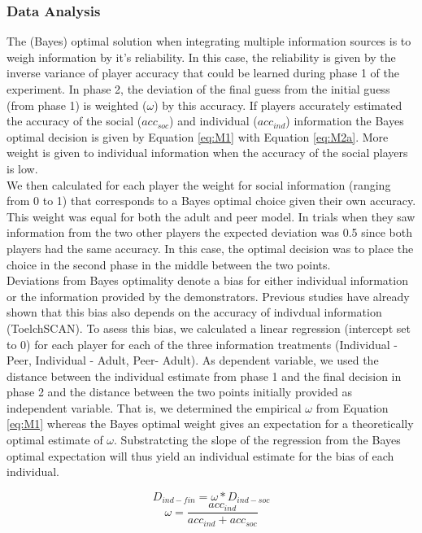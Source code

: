 \documentclass[man]{apa}
\begin{document}
\subsubsection{Data Analysis}
The (Bayes) optimal solution when integrating multiple information sources is to weigh information by it's reliability. In this case, the reliability is given by the inverse variance of player accuracy that could be learned during phase 1 of the experiment. In phase 2, the deviation of the final guess from the initial guess (from phase 1) is weighted ($\omega$) by this accuracy. If players accurately estimated the accuracy of the social ($acc_{soc}$) and individual ($acc_{ind}$) information the Bayes optimal decision is given by Equation \ref{eq:M1} with Equation \ref{eq:M2a}. More weight is given to individual information when the accuracy of the social players is low. \\
We then calculated for each player the weight for social information (ranging from 0 to 1) that corresponds to a Bayes optimal choice given their own accuracy. This weight was equal for both the adult and peer model. In trials when they saw information from the two other players the expected deviation was 0.5 since both players had the same accuracy. In this case, the optimal decision was to place the choice in the second phase in the middle between the two points. \\
Deviations from Bayes optimality denote a bias for either individual information or the information provided by the demonstrators. Previous studies have already shown that this bias also depends on the accuracy of indivdual information (ToelchSCAN). To asess this bias, we calculated a linear regression (intercept set to 0) for each player for each of the three information treatments (Individual - Peer, Individual - Adult, Peer- Adult). As dependent variable, we used the distance between the individual estimate from phase 1 and the final decision in phase 2 and the distance between the two points initially provided as independent variable. That is, we determined the empirical $\omega$ from Equation \ref{eq:M1} whereas the Bayes optimal weight gives an expectation for a theoretically optimal estimate of $\omega$. Substratcting the slope of the regression from the Bayes optimal expectation will thus yield an individual estimate for the bias of each individual. 

\begin{equation}
D_{ind-fin}=\omega * D_{ind-soc}
\label{eq:M1}
\end{equation} 
\begin{equation}
\omega=\frac{acc_{ind}}{acc_{ind}+acc_{soc}}
\label{eq:M2a}
\end{equation}
\end{document}
